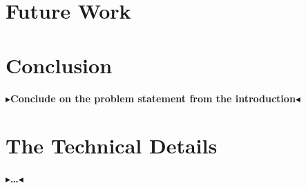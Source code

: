 \documentclass[twoside,11pt,openright]{report}
\theoremstyle{definition}
\newcommand{\todo}[1]{{\color[rgb]{.5,0,0}\textbf{$\blacktriangleright$#1$\blacktriangleleft$}}}
\begin{document}

\chapter{Future Work}
\label{ch:future_work}

\chapter{Conclusion}
\label{ch:conclusion}

\todo{Conclude on the problem statement from the introduction}


\cleardoublepage
{}




\cleardoublepage
\appendix
\chapter{The Technical Details}

\todo{\dots}
\end{document}
